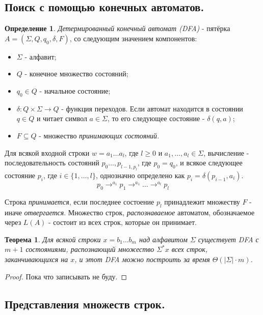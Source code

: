 \documentclass[a4paper]{article}
\theoremstyle{indented}
\newtheorem{theorem}{Теорема}
\theoremstyle{definition}
\newtheorem{defn}{Определение}
\theoremstyle{remark}
\begin{document}
\subsection{Поиск с помощью конечных автоматов.}

\begin{defn}
    \textit{Детермированный конечный автомат (DFA)} - пятёрка $A=(\Sigma, Q, q_0, \delta, F)$, со следующим значением компонентов:
    
    \begin{itemize}
        \item $\Sigma$ - алфавит; 
        \item $Q$ - конечное множество состояний; 
        \item $q_0\in Q$ - начальное состояние; 
        \item $\delta:Q\times \Sigma \rightarrow Q$ - функция переходов. Если автомат находится в состоянии $q\in Q$ и читает символ $a\in \Sigma$, то его следующее состояние - $\delta(q, a)$; 
        \item $F\subseteq Q$ - множество \textit{принимающих состояний}.
    \end{itemize}

    Для всякой входной строки $w=a_1\ldots a_l$, где $l\geq 0$ и $a_1, \ldots, a_l\in \Sigma$, вычисление - последовательность состояний $p_0 \ldots, p_{l-1, p_l}$, где $p_0=q_0$, и всякое следующее состояние $p_i$, где $i\in\{1, \ldots, l\}$, однозначно определено как $p_i=\delta(p_{i-1}, a_i)$. 
    \[
        p_0\rightarrow^{a_1}p_1\rightarrow^{a_1}\ldots \rightarrow^{a_l} p_l
    \]

    Строка \textit{принимается}, если последнее состоение $p_l$ принадлежит множеству $F$ - иначе \textit{отвергается}. Множество строк, \textit{распознаваемое} автоматом, обозначаемое через $L(A)$ - состоит из всех строк, которые он принимает.
\end{defn}

\begin{theorem}
    Для всякой строки $x=b_1\ldots b_m$ над алфавитом $\Sigma$ существует DFA с $m+1$ состояниями, распознающий множество $\Sigma^* x$ всех строк, заканчивающихся на $x$, и этот DFA можно построить за время $\Theta(|\Sigma|\cdot m)$. 
\end{theorem}

\begin{proof}
    Пока что записывать не буду.
\end{proof}

\subsection{Представления множеств строк.}
\end{document}
